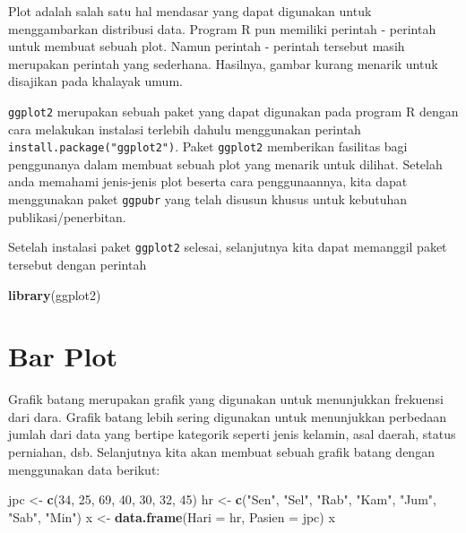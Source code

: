 \documentclass[
]{book}
\newenvironment{Shaded}{\begin{snugshade}}{\end{snugshade}}
\newcommand{\DataTypeTok}[1]{\textcolor[rgb]{0.13,0.29,0.53}{#1}}
\newcommand{\DecValTok}[1]{\textcolor[rgb]{0.00,0.00,0.81}{#1}}
\newcommand{\KeywordTok}[1]{\textcolor[rgb]{0.13,0.29,0.53}{\textbf{#1}}}
\newcommand{\NormalTok}[1]{#1}
\newcommand{\StringTok}[1]{\textcolor[rgb]{0.31,0.60,0.02}{#1}}
\begin{document}
Plot adalah salah satu hal mendasar yang dapat digunakan untuk menggambarkan distribusi data. Program R pun memiliki perintah - perintah untuk membuat sebuah plot. Namun perintah - perintah tersebut masih merupakan perintah yang sederhana. Hasilnya, gambar kurang menarik untuk disajikan pada khalayak umum.

\texttt{ggplot2} merupakan sebuah paket yang dapat digunakan pada program R dengan cara melakukan instalasi terlebih dahulu menggunakan perintah \texttt{install.package("ggplot2")}. Paket \texttt{ggplot2} memberikan fasilitas bagi penggunanya dalam membuat sebuah plot yang menarik untuk dilihat. Setelah anda memahami jenis-jenis plot beserta cara penggunaannya, kita dapat menggunakan paket \texttt{ggpubr} yang telah disusun khusus untuk kebutuhan publikasi/penerbitan.

Setelah instalasi paket \texttt{ggplot2} selesai, selanjutnya kita dapat memanggil paket tersebut dengan perintah

\begin{Shaded}
\begin{Highlighting}[]
\KeywordTok{library}\NormalTok{(ggplot2)}
\end{Highlighting}
\end{Shaded}

\hypertarget{bar-plot}{%
\section{Bar Plot}\label{bar-plot}}

Grafik batang merupakan grafik yang digunakan untuk menunjukkan frekuensi dari dara. Grafik batang lebih sering digunakan untuk menunjukkan perbedaan jumlah dari data yang bertipe kategorik seperti jenis kelamin, asal daerah, status perniahan, dsb. Selanjutnya kita akan membuat sebuah grafik batang dengan menggunakan data berikut:

\begin{Shaded}
\begin{Highlighting}[]
\NormalTok{jpc <-}\StringTok{ }\KeywordTok{c}\NormalTok{(}\DecValTok{34}\NormalTok{, }\DecValTok{25}\NormalTok{, }\DecValTok{69}\NormalTok{, }\DecValTok{40}\NormalTok{, }\DecValTok{30}\NormalTok{, }\DecValTok{32}\NormalTok{, }\DecValTok{45}\NormalTok{)}
\NormalTok{hr  <-}\StringTok{ }\KeywordTok{c}\NormalTok{(}\StringTok{"Sen"}\NormalTok{, }\StringTok{"Sel"}\NormalTok{, }\StringTok{"Rab"}\NormalTok{, }\StringTok{"Kam"}\NormalTok{, }\StringTok{"Jum"}\NormalTok{, }\StringTok{"Sab"}\NormalTok{, }\StringTok{"Min"}\NormalTok{)}
\NormalTok{x   <-}\StringTok{ }\KeywordTok{data.frame}\NormalTok{(}\DataTypeTok{Hari =}\NormalTok{ hr, }\DataTypeTok{Pasien =}\NormalTok{ jpc)}
\NormalTok{x}
\end{Highlighting}
\end{Shaded}
\end{document}
